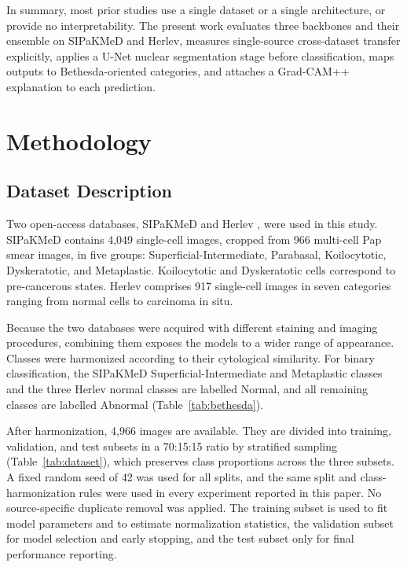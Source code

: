 \documentclass[runningheads]{llncs}
\begin{document}
In summary, most prior studies use a single dataset or a single architecture, or provide no interpretability. The present work evaluates three backbones and their ensemble on SIPaKMeD and Herlev, measures single-source cross-dataset transfer explicitly, applies a U-Net nuclear segmentation stage before classification, maps outputs to Bethesda-oriented categories, and attaches a Grad-CAM++ explanation to each prediction.

\section{Methodology}
\label{sec:method}

\subsection{Dataset Description}
\label{sec:data}

Two open-access databases, SIPaKMeD \cite{plissiti2018sipakmed} and Herlev \cite{jantzen2005}, were used in this study. SIPaKMeD contains 4,049 single-cell images, cropped from 966 multi-cell Pap smear images, in five groups: Superficial-Intermediate, Parabasal, Koilocytotic, Dyskeratotic, and Metaplastic. Koilocytotic and Dyskeratotic cells correspond to pre-cancerous states. Herlev comprises 917 single-cell images in seven categories ranging from normal cells to carcinoma in situ.

Because the two databases were acquired with different staining and imaging procedures, combining them exposes the models to a wider range of appearance. Classes were harmonized according to their cytological similarity. For binary classification, the SIPaKMeD Superficial-Intermediate and Metaplastic classes and the three Herlev normal classes are labelled Normal, and all remaining classes are labelled Abnormal (Table~\ref{tab:bethesda}).

After harmonization, 4,966 images are available. They are divided into training, validation, and test subsets in a 70:15:15 ratio by stratified sampling (Table~\ref{tab:dataset}), which preserves class proportions across the three subsets. A fixed random seed of 42 was used for all splits, and the same split and class-harmonization rules were used in every experiment reported in this paper. No source-specific duplicate removal was applied. The training subset is used to fit model parameters and to estimate normalization statistics, the validation subset for model selection and early stopping, and the test subset only for final performance reporting.
\end{document}
